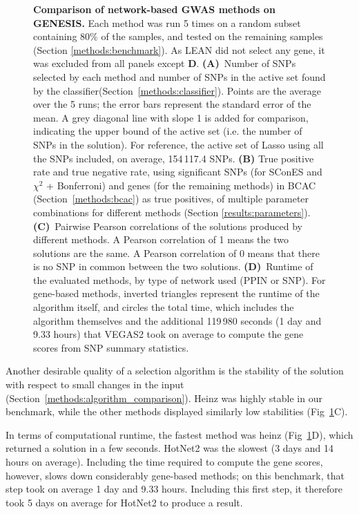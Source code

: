 \documentclass[10pt,letterpaper]{article}
\begin{document}
\begin{figure}[!ht]
  \caption{{ \bf Comparison of network-based GWAS methods on GENESIS. } Each method was run 5 times on a random subset containing 80\% of the samples, and tested on the remaining samples (Section \ref{methods:benchmark}). As LEAN did not select any gene, it was excluded from all panels except \textbf{D}. \textbf{(A)}~Number of SNPs selected by each method and number of SNPs in the active set found by the classifier(Section~\ref{methods:classifier}). Points are the average over the 5 runs; the error bars represent the standard error of the mean. A grey diagonal line with slope 1 is added for comparison, indicating the upper bound of the active set (i.e. the number of SNPs in the solution). For reference, the active set of Lasso using all the SNPs included, on average, 154\,117.4 SNPs. \textbf{(B)} True positive rate and true negative rate, using significant SNPs (for SConES and $\chi^2$ + Bonferroni) and genes (for the remaining methods) in BCAC (Section~\ref{methods:bcac}) as true positives, of multiple parameter combinations for different methods (Section \ref{results:parameters}). \textbf{(C)}~Pairwise Pearson correlations of the solutions produced by different methods. A Pearson correlation of 1 means the two solutions are the same. A Pearson correlation of 0 means that there is no SNP in common between the two solutions. \textbf{(D)}~Runtime of the evaluated methods, by type of network used (PPIN or SNP). For gene-based methods, inverted triangles represent the runtime of the algorithm itself, and circles the total time, which includes the algorithm themselves and the additional 119\,980 seconds (1 day and 9.33 hours) that VEGAS2 took on average to compute the gene scores from SNP summary statistics.}
  \label{fig:benchmark}
  \end{figure}

Another desirable quality of a selection algorithm is the stability of the solution with respect to small changes in the input (Section~\ref{methods:algorithm_comparison}). Heinz was highly stable in our benchmark, while the other methods displayed similarly low stabilities (Fig~\ref{fig:benchmark}C).

In terms of computational runtime, the fastest method was heinz (Fig~\ref{fig:benchmark}D), which returned a solution in a few seconds. HotNet2 was the slowest (3 days and 14 hours on average). Including the time required to compute the gene scores, however, slows down considerably gene-based methods; on this benchmark, that step took on average 1 day and 9.33 hours. Including this first step, it therefore took 5 days on average for HotNet2 to produce a result.
\end{document}

